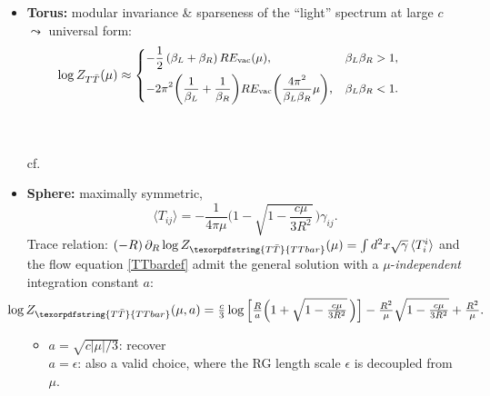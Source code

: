 \documentclass[10pt]{article}
\newcommand{\citations}[1]{{\footnotesize#1\par}}
\newcommand{\TTbar}{\texorpdfstring{\ensuremath{T\bar{T}}}{TTbar}\xspace}
\begin{document}
\begin{multicols}{3}
\begin{itemize}
\item \textbf{Torus:} {modular invariance} \& sparseness of the ``light'' spectrum at large $c$ $\leadsto$ universal form:
	\begin{equation*}\small
	\hspace{-2.8em}
		\log Z_{T\bar T}(\mu)  \approx \left\{ \begin{aligned}
		& {-\frac{1}{2}}\,(\beta_L + \beta_R)\, RE_{\text{vac}}(\mu),  &\beta_L \beta_R > 1, \\
		& {-2 \pi^2 \bigg(\frac{1}{\beta_L} + \frac{1}{\beta_R}\bigg)  RE_{\text{vac}}\bigg(\frac{4\pi^2}{\beta_L \beta_R} \mu \bigg)},  &\beta_L\beta_R < 1. %
		 \end{aligned} \right. %
	\end{equation*}
	\begin{flushright}
		\vspace{-.5\baselineskip}
		\citations{\noindent%
			\textcite{Datta:2018thy}\\
			\textcite{Apolo:2023aho}\\
			cf.~\textcite{Hartman:2014oaa}
		}
		\vspace{-.5\baselineskip}
	\end{flushright}

\item \textbf{Sphere:} maximally symmetric,\\[-1.4\baselineskip]

\hfill\mbox{\footnotesize \textcite{Donnelly:2018bef}}
	\begin{equation}
		\langle T_{ij}\rangle = -\frac{1}{4\pi\mu} \bigg(1-\sqrt{1-\frac{c\mu}{3R^2}}\, \bigg)  \gamma_{ij}.
	\end{equation}
Trace relation: \mbox{$
(-R)\,\partial_R \log Z_{\TTbar}(\mu)=\int d^2x\sqrt{\gamma}\,\langle T^i_i \rangle
$} and the flow equation \eqref{TTbardef} 
admit the general \mbox{solution} with a $\mu$-\textit{independent} integration constant $a$:
	\begin{equation*}\small
	\hspace{-1.8em}
		\log Z_{\TTbar}(\mu, a) = \tfrac{c}{3} \log \Big[\tfrac{R}{a}   \Big(1+\sqrt{1-\tfrac{c \mu }{3  R^2}}\, \Big) \Big] - \tfrac{R^2}{\mu}  \sqrt{1-\tfrac{c \mu }{3 R^2}} + \tfrac{R^2}{\mu}. %
	\end{equation*}
	\begin{itemize}%
	\item $a = \sqrt{c|\mu|/3}$: \mbox{recover {\small
		\textsl{\citeauthor{Donnelly:2018bef}}
		\cite{Donnelly:2018bef}
	}} \\
	$a = \epsilon$: also a valid choice, where the RG length scale $\epsilon$ is decoupled from $\mu$.
	

\end{itemize}
\end{itemize}
\end{multicols}
\end{document}
